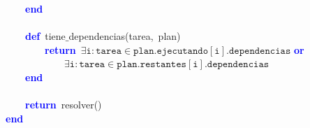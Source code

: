 \mbox{}\ \ \ \ \textbf{\textcolor{Blue}{end}} \\
\mbox{} \\
\mbox{}\ \ \ \ \textbf{\textcolor{Blue}{def}}\ tiene$\_$dependencias\textcolor{BrickRed}{(}tarea\textcolor{BrickRed}{,}\ plan\textcolor{BrickRed}{)} \\
\mbox{}\ \ \ \ \ \ \ \ \textbf{\textcolor{Blue}{return}}\ $\mathtt{\exists i : tarea \in plan.ejecutando[i].dependencias}$ \textbf{\textcolor{Blue}{or}} \\
\mbox{}\ \ \ \ \ \ \ \ \ \ \ \ $\mathtt{\exists i : tarea \in plan.restantes[i].dependencias}$ \\
\mbox{}\ \ \ \ \textbf{\textcolor{Blue}{end}} \\
\mbox{} \\
\mbox{}\ \ \ \ \textbf{\textcolor{Blue}{return}}\ resolver\textcolor{BrickRed}{()} \\
\mbox{}\textbf{\textcolor{Blue}{end}} \\
\mbox{}
